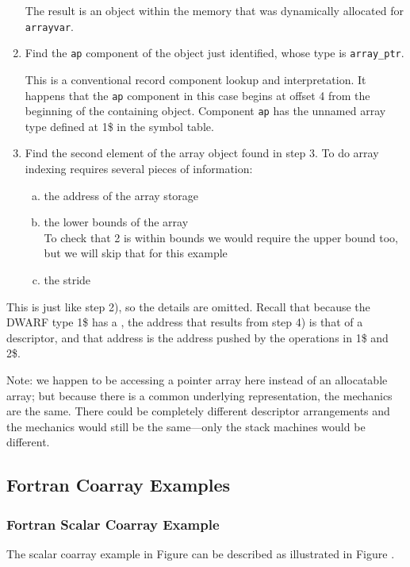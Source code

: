 \begin{enumerate}[1. ]
The result is an object within the memory that was dynamically
allocated for \texttt{arrayvar}.

\item  Find the \texttt{ap} component of the object just identified,
whose type is \texttt{array\_ptr}.

This is a conventional record component lookup and
interpretation. It happens that the \texttt{ap} component in this case
begins at offset 4 from the beginning of the containing object.
Component \texttt{ap} has the unnamed array type defined at 1\$ in the
symbol table.

\item  Find the second element of the array object found in step 3. To do array indexing requires
several pieces of information:
\begin{enumerate}[a) ]
\item  the address of the array storage

\item  the lower bounds of the array \\
\lbrack To check that 2 is within bounds we would require the upper
bound too, but we will skip that for this example \rbrack

\item  the stride

\end{enumerate}
\end{enumerate}

This is just like step 2), so the details are omitted. Recall
that because the DWARF type 1\$ has a \DWATdatalocation,
the address that results from step 4) is that of a
descriptor, and that address is the address pushed by the
\DWOPpushobjectaddress{} operations in 1\$ and 2\$.

Note: we happen to be accessing a pointer array here instead
of an allocatable array; but because there is a common
underlying representation, the mechanics are the same. There
could be completely different descriptor arrangements and the
mechanics would still be the same---only the stack machines
would be different.

\subsection{Fortran Coarray Examples}
\label{app:Fortrancoarrayexamples}

\subsubsection{Fortran Scalar Coarray Example}
The  scalar coarray example
in Figure  can be described as 
illustrated in Figure .

